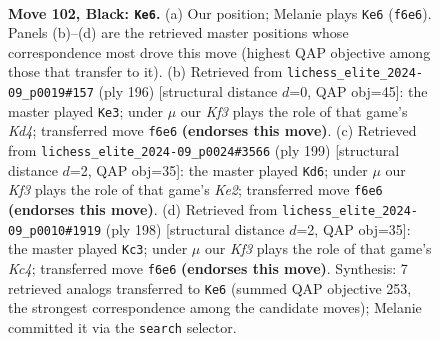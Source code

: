 \documentclass[11pt]{article}
\begin{document}
\clearpage

\begin{figure}[p]\centering
\begin{subfigure}{0.46\textwidth}\centering
\resizebox{\linewidth}{!}{%
\newchessgame
\chessboard[
  setfen={5R2/8/5k2/8/7r/r7/5K2/8 b - - 15 102},
  showmover=false,
  pgfstyle=straightmove, color=movearrow, markmove={f6-e6}
]}
\caption{}
\end{subfigure}\hfill
\begin{subfigure}{0.46\textwidth}\centering
\resizebox{\linewidth}{!}{%
\newchessgame
\chessboard[
  setfen={1R6/8/8/k7/3K2r1/8/2R5/8 w - - 17 99},
  showmover=false,
  pgfstyle=straightmove, color=movearrow, markmove={d4-e3}
]}
\caption{}
\end{subfigure}
\\[4pt]
\begin{subfigure}{0.46\textwidth}\centering
\resizebox{\linewidth}{!}{%
\newchessgame
\chessboard[
  setfen={8/R3k3/8/1r6/4K3/8/8/8 b - - 37 100},
  showmover=false,
  pgfstyle=straightmove, color=movearrow, markmove={e7-d6}
]}
\caption{}
\end{subfigure}\hfill
\begin{subfigure}{0.46\textwidth}\centering
\resizebox{\linewidth}{!}{%
\newchessgame
\chessboard[
  setfen={8/5k2/R7/8/2K3r1/8/8/8 w - - 17 100},
  showmover=false,
  pgfstyle=straightmove, color=movearrow, markmove={c4-c3}
]}
\caption{}
\end{subfigure}
\caption{\textbf{Move 102, Black: \texttt{Ke6}.} (a) Our position; Melanie plays \texttt{Ke6} (\texttt{f6e6}). Panels (b)--(d) are the retrieved master positions whose correspondence most drove this move (highest QAP objective among those that transfer to it). (b) Retrieved from \texttt{lichess\_elite\_2024-09\_p0019\#157} (ply 196) [structural distance $d$=0, QAP obj=45]: the master played \texttt{Ke3}; under $\mu$ our \emph{Kf3} plays the role of that game's \emph{Kd4}; transferred move \texttt{f6e6} \textbf{(endorses this move)}. (c) Retrieved from \texttt{lichess\_elite\_2024-09\_p0024\#3566} (ply 199) [structural distance $d$=2, QAP obj=35]: the master played \texttt{Kd6}; under $\mu$ our \emph{Kf3} plays the role of that game's \emph{Ke2}; transferred move \texttt{f6e6} \textbf{(endorses this move)}. (d) Retrieved from \texttt{lichess\_elite\_2024-09\_p0010\#1919} (ply 198) [structural distance $d$=2, QAP obj=35]: the master played \texttt{Kc3}; under $\mu$ our \emph{Kf3} plays the role of that game's \emph{Kc4}; transferred move \texttt{f6e6} \textbf{(endorses this move)}. Synthesis: 7 retrieved analogs transferred to \texttt{Ke6} (summed QAP objective 253, the strongest correspondence among the candidate moves); Melanie committed it via the \texttt{search} selector.}
\label{fig:thought-m203}
\end{figure}
\end{document}
